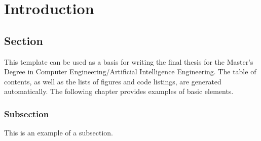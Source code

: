 \chapter{Introduction}
\label{ch:introduction}

\section{Section}
\label{sec:objective}

This template can be used as a basis for writing the final thesis for the Master’s Degree in Computer Engineering/Artificial Intelligence Engineering. The table of contents, as well as the lists of figures and code listings, are generated automatically. The following chapter provides examples of basic elements.

\subsection{Subsection}
This is an example of a subsection.
